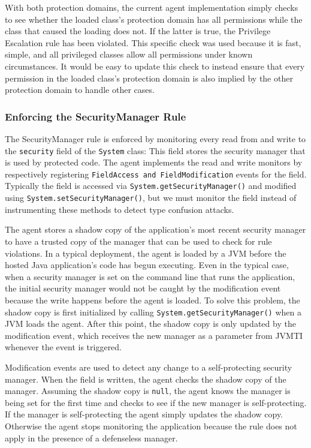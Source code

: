 \documentclass{sig-alternate}
\begin{document}
With both protection domains, the current agent implementation simply
checks to see whether the loaded class's protection domain has all
permissions while the class that caused the loading does not. If the
latter is true, the Privilege Escalation rule has been violated. This
specific check was used because it is fast, simple, and all privileged
classes allow all permissions under known circumstances. It would
be easy to update this check to instead ensure that every permission
in the loaded class's protection domain is also implied by the other
protection domain to handle other cases.


\subsubsection{Enforcing the SecurityManager Rule}\label{sub:Enforcing-the-SecurityManager}

The SecurityManager rule is enforced by monitoring every read from
and write to the \texttt{security} field of the \texttt{System} class:
This field stores the security manager that is used by protected code.
The agent implements the read and write monitors by respectively registering
\texttt{FieldAccess and FieldModification} events for the field. Typically
the field is accessed via \texttt{System.getSecurityManager()}
and modified using \texttt{System.setSecurityManager()}, but we must
monitor the field instead of instrumenting these methods to detect
type confusion attacks. 

The agent stores a shadow copy of the application's most recent security
manager to have a trusted copy of the manager that can be used to
check for rule violations. In a typical deployment, the agent is loaded
by a JVM before the hosted Java application's code has begun executing.
Even in the typical case, when a security manager is set on the command
line that runs the application, the initial security manager would
not be caught by the modification event because the write happens
before the agent is loaded. To solve this problem, the shadow copy
is first initialized by calling \texttt{System.getSecurityManager()}
when a JVM loads the agent. After this point, the shadow copy is only
updated by the modification event, which receives the new manager
as a parameter from JVMTI whenever the event is triggered.

Modification events are used to detect any change to a self-protecting
security manager. When the field is written, the agent checks the
shadow copy of the manager. Assuming the shadow copy is \texttt{null},
the agent knows the manager is being set for the first time and checks
to see if the new manager is self-protecting. If the manager is self-protecting
the agent simply updates the shadow copy. Otherwise the agent stops monitoring the application because the rule does not apply in the presence of a defenseless manager.
\end{document}
